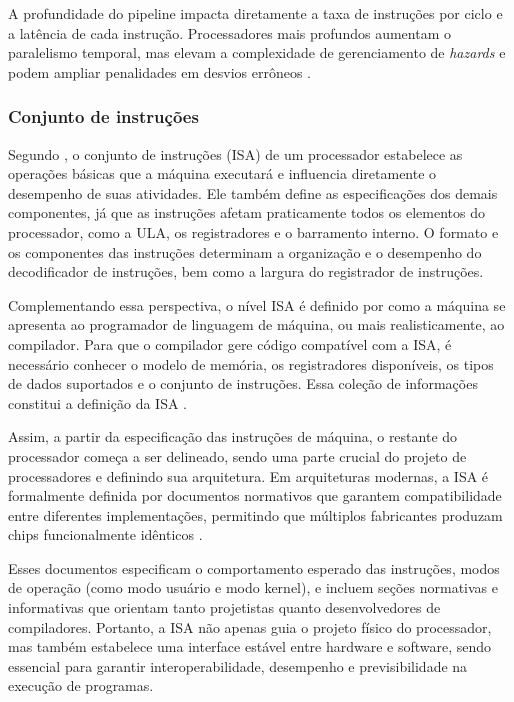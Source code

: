 \documentclass[
	12pt,				%
	openright,			%
	oneside,			%
	a4paper,			%
	english,			%
	french,				%
	spanish,			%
	brazil,				%
	]{abntex2}
\begin{document}
A profundidade do pipeline impacta diretamente a taxa de instruções por ciclo e a latência de cada instrução. Processadores mais profundos aumentam o paralelismo temporal, mas elevam a complexidade de gerenciamento de \textit{hazards} e podem ampliar penalidades em desvios errôneos \cite[p.47-51]{stallings_reduced_1988}.

\subsubsection{Conjunto de instruções}
Segundo , o conjunto de instruções (ISA) de um processador estabelece as operações básicas que a máquina executará e influencia diretamente o desempenho de suas atividades. Ele também define as especificações dos demais componentes, já que as instruções afetam praticamente todos os elementos do processador, como a ULA, os registradores e o barramento interno. O formato e os componentes das instruções determinam a organização e o desempenho do decodificador de instruções, bem como a largura do registrador de instruções.

Complementando essa perspectiva, o nível ISA é definido por como a máquina se apresenta ao programador de linguagem de máquina, ou mais realisticamente, ao compilador. Para que o compilador gere código compatível com a ISA, é necessário conhecer o modelo de memória, os registradores disponíveis, os tipos de dados suportados e o conjunto de instruções. Essa coleção de informações constitui a definição da ISA \cite[p.345-346]{tanenbaum_structured_2013}.

Assim, a partir da especificação das instruções de máquina, o restante do processador começa a ser delineado, sendo uma parte crucial do projeto de processadores e definindo sua arquitetura. Em arquiteturas modernas, a ISA é formalmente definida por documentos normativos que garantem compatibilidade entre diferentes implementações, permitindo que múltiplos fabricantes produzam chips funcionalmente idênticos \cite[p.346]{tanenbaum_structured_2013}.

Esses documentos especificam o comportamento esperado das instruções, modos de operação (como modo usuário e modo kernel), e incluem seções normativas e informativas que orientam tanto projetistas quanto desenvolvedores de compiladores. Portanto, a ISA não apenas guia o projeto físico do processador, mas também estabelece uma interface estável entre hardware e software, sendo essencial para garantir interoperabilidade, desempenho e previsibilidade na execução de programas.
\cite[p.346-347]{tanenbaum_structured_2013}
\end{document}
